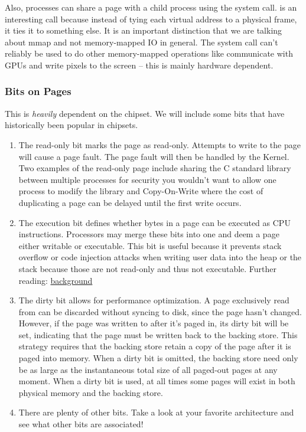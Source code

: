 	Also, processes can share a page with a child process using the  system call.
	 is an interesting call because instead of tying each virtual address to a physical frame, it ties it to something else. It is an important distinction that we are talking about mmap and not memory-mapped IO in general. The  system call can't reliably be used to do other memory-mapped operations like communicate with GPUs and write pixels to the screen -- this is mainly hardware dependent.
	 
	\subsubsection{Bits on Pages}
	 
	This is \textit{heavily} dependent on the chipset.
	We will include some bits that have historically been popular in chipsets.
	 
	\begin{enumerate}
	\item The read-only bit marks the page as read-only.
	Attempts to write to the page will cause a page fault.
	The page fault will then be handled by the Kernel.
	Two examples of the read-only page include sharing the C standard library between multiple processes for security you wouldn't want to allow one process to modify the library and Copy-On-Write where the cost of duplicating a page can be delayed until the first write occurs.
	 
	\item The execution bit defines whether bytes in a page can be executed as CPU instructions.
	Processors may merge these bits into one and deem a page either writable or executable.
	This bit is useful because it prevents stack overflow or code injection attacks when writing user data into the heap or the stack because those are not read-only and thus not executable.
	Further reading: \href{http://en.wikipedia.org/wiki/NX\_bit\#Hardware\_background}{background}
	 
	\item The dirty bit allows for performance optimization.
	A page exclusively read from can be discarded without syncing to disk, since the page hasn't changed.
	However, if the page was written to after it's paged in, its dirty bit will be set, indicating that the page must be written back to the backing store.
	This strategy requires that the backing store retain a copy of the page after it is paged into memory.
	When a dirty bit is omitted, the backing store need only be as large as the instantaneous total size of all paged-out pages at any moment.
	When a dirty bit is used, at all times some pages will exist in both physical memory and the backing store.
	\item There are plenty of other bits. Take a look at your favorite architecture and see what other bits are associated!
	\end{enumerate}
	 
